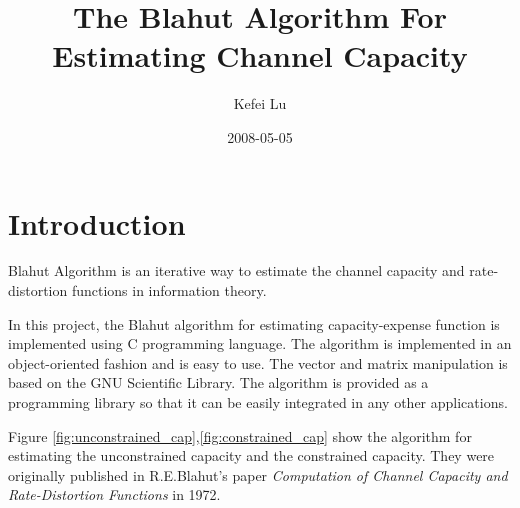 \documentclass[a4paper,10pt]{article}
\author{Kefei Lu}
\title{The Blahut Algorithm For Estimating Channel Capacity}
\date{2008-05-05}
\begin{document}
\maketitle


\section{Introduction}
Blahut Algorithm is an iterative way to estimate the channel capacity and rate-distortion functions in information theory. 

In this project, the Blahut algorithm for estimating capacity-expense function is implemented using C programming language. The algorithm is implemented in an object-oriented fashion and is easy to use. The vector and matrix manipulation is based on the GNU Scientific Library. The algorithm is provided as a programming library so that it can be easily integrated in any other applications.

Figure \ref{fig:unconstrained_cap},\ref{fig:constrained_cap} show the algorithm for estimating the unconstrained capacity and the constrained capacity. They were originally published in R.E.Blahut's paper \textit{Computation of Channel Capacity and Rate-Distortion Functions} in 1972. 
\end{document}
